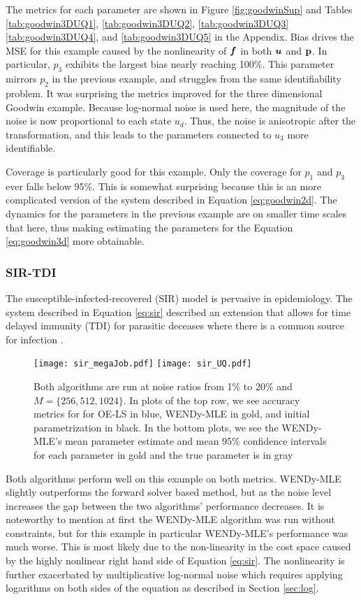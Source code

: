  The metrics for each parameter are shown in Figure \ref{fig:goodwinSup} and Tables \ref{tab:goodwin3DUQ1}, \ref{tab:goodwin3DUQ2}, \ref{tab:goodwin3DUQ3} \ref{tab:goodwin3DUQ4}, and \ref{tab:goodwin3DUQ5} in the Appendix. Bias drives the MSE for this example caused by the nonlinearity of $\boldsymbol{f}$ in both $\boldsymbol{u}$ and $\mathbf{p}$. In particular, $p_3$ exhibits the largest bias nearly reaching 100\%. This parameter mirrors $p_2$ in the previous example, and struggles from the same identifiability problem. It was surprising the metrics improved for the three dimensional Goodwin example. Because log-normal noise is used here, the magnitude of the noise is now proportional to each state $u_d$. Thus, the noise is anisotropic after the transformation, and this leads to the parameters connected to $u_3$ more identifiable.

Coverage is particularly good for this example. Only the coverage for $p_1$ and $p_3$ ever falls below 95\%. This is somewhat surprising because this is an more complicated version of the system described in Equation \eqref{eq:goodwin2d}. The dynamics for the parameters in the previous example are on smaller time scales that here, thus making estimating the parameters for the Equation \eqref{eq:goodwin3d} more obtainable.   

\subsubsection{SIR-TDI} \label{sec:sir}
The susceptible-infected-recovered (SIR) model is pervasive in epidemiology. The system described in Equation \eqref{eq:sir} described an extension that allows for time delayed immunity (TDI) for parasitic deceases where there is a common source for infection \cite{ShonkwilerHerod2009}. 
\begin{figure}[H]
	\centering
	\texttt{[image: sir\_megaJob.pdf]}
	\texttt{[image: sir\_UQ.pdf]}
	\caption{Both algorithms are run at noise ratios from 1\% to 20\% and $M = \{256, 512,1024\}$. In plots of the top row, we see accuracy metrics for for OE-LS in blue, WENDy-MLE in gold, and initial parametrization in black. In the bottom plots, we see the WENDy-MLE's mean parameter estimate and mean 95\% confidence intervals for each parameter in gold and the true parameter is in gray}
	\label{fig:sirMega}
\end{figure}

Both algorithms  perform well on this example on both metrics. WENDy-MLE slightly outperforms the forward solver based method, but  as the noise level increases the gap between the two algorithms' performance decreases. It is noteworthy to mention at first the WENDy-MLE algorithm was run without constraints, but for this example in particular WENDy-MLE's performance was much worse. This is most likely due to the non-linearity in the cost space caused by the highly nonlinear right hand side of Equation \eqref{eq:sir}. The nonlinearity is further exacerbated by multiplicative log-normal noise which requires applying logarithms on both sides of the equation as described in Section \ref{sec:log}.

